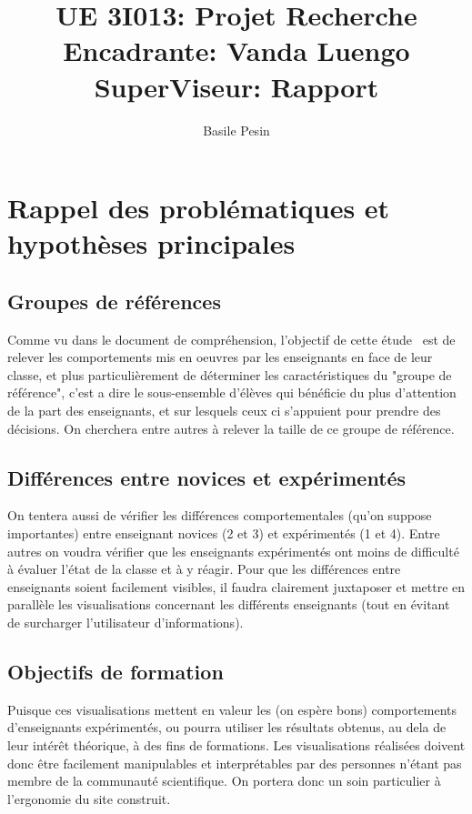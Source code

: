 \documentclass{article}
\title{UE 3I013: Projet Recherche\\
    Encadrante: Vanda Luengo\\
    SuperViseur: Rapport}
\author{Basile Pesin}
\begin{document}
\maketitle
\newpage

\tableofcontents
\newpage

\section{Rappel des problématiques et hypothèses principales}

\subsection{Groupes de références}
Comme vu dans le document de compréhension, l'objectif de cette étude~\cite{SuperViseur} est de relever les comportements mis en oeuvres par les enseignants en face de leur classe, et plus particulièrement de déterminer les caractéristiques du "groupe de référence", c'est a dire le sous-ensemble d'élèves qui bénéficie du plus d'attention de la part des enseignants, et sur lesquels ceux ci s'appuient pour prendre des décisions. On cherchera entre autres à relever la taille de ce groupe de référence.

\subsection{Différences entre novices et expérimentés}
On tentera aussi de vérifier les différences comportementales (qu'on suppose importantes) entre enseignant novices (2 et 3) et expérimentés (1 et 4). Entre autres on voudra vérifier que les enseignants expérimentés ont moins de difficulté à évaluer l'état de la classe et à y réagir. Pour que les différences entre enseignants soient facilement visibles, il faudra clairement juxtaposer et mettre en parallèle les visualisations concernant les différents enseignants (tout en évitant de surcharger l'utilisateur d'informations).

\subsection{Objectifs de formation}
Puisque ces visualisations mettent en valeur les (on espère bons) comportements d'enseignants expérimentés, ou pourra utiliser les résultats obtenus, au dela de leur intérêt théorique, à des fins de formations. Les visualisations réalisées doivent donc être facilement manipulables et interprétables par des personnes n'étant pas membre de la communauté scientifique. On portera donc un soin particulier à l'ergonomie du site construit.
\end{document}
